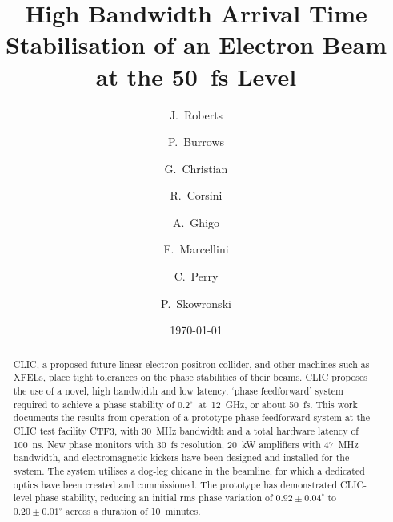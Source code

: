 \documentclass[%
 reprint,
superscriptaddress,
 amsmath,amssymb,
 prl,
]{revtex4-1}
\begin{document}

\title{High Bandwidth Arrival Time Stabilisation of an Electron Beam at 
the 
50~fs Level}

\author{J.~Roberts}

\author{P.~Burrows}

\author{G.~Christian}

\author{R.~Corsini}

\author{A.~Ghigo}

\author{F.~Marcellini}

\author{C.~Perry}

\author{P.~Skowronski}

\date{\today}

\begin{abstract}
CLIC, a proposed future linear electron-positron collider, and other machines 
such as XFELs, place tight tolerances on the phase stabilities of their beams. 
CLIC proposes the use of a novel, high bandwidth and low latency, `phase 
feedforward' system required to achieve a phase stability of 
\(0.2^\circ\)~at~12~GHz, or 
about 50~fs. This work documents the results from operation of a prototype 
phase 
feedforward system at the CLIC test facility CTF3, with 30~MHz bandwidth and a 
total hardware latency of 100~ns. New phase monitors with 
30~fs resolution, 20~kW amplifiers with 47~MHz bandwidth, and electromagnetic 
kickers have been designed and installed for the system. The system utilises a 
dog-leg chicane in the beamline, for which a dedicated optics have been created 
and 
commissioned. The prototype has demonstrated CLIC-level phase stability, 
reducing an initial rms phase variation of \(0.92\pm0.04^\circ\) to 
\(0.20\pm0.01^\circ\) across a duration of 10~minutes.
\end{abstract}

\maketitle
\end{document}
